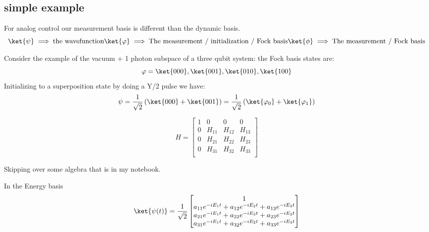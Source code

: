 \subsection{simple example}
For analog control our measurement basis is different than the dynamic basis.
\begin{equation*}
    \ket{\psi} \implies \textrm{the wavefunction}
    \ket{\varphi} \implies \textrm{The measurement / initialization / Fock basis}
    \ket{\phi} \implies \textrm{The measurement / Fock basis}
\end{equation*}

Consider the example of the vacuum + 1 photon subspace of a three qubit system:
the Fock basis states are:
\begin{equation*}
    \varphi = \ket{000}, \ket{001}, \ket{010}, \ket{100}
\end{equation*}
Initializing to a superposition state by doing a Y/2 pulse we have:
\begin{equation*}
    \psi = \frac{1}{\sqrt{2}} \left( \ket{000} + \ket{001} \right) = \frac{1}{\sqrt{2}} \left( \ket{\varphi_0} + \ket{\varphi_1} \right)
\end{equation*}

\begin{equation}
    H=
    \begin{bmatrix}
        1 & 0 & 0 & 0 \\
        0 & H_{11} & H_{12} & H_{13} \\
        0 & H_{21} & H_{22} & H_{23} \\
        0 & H_{31} & H_{32} & H_{33} \\
    \end{bmatrix}
\end{equation}

Skipping over some algebra that is in my notebook.

In the Energy basis
\begin{equation}
    \ket{\psi (t)} = \frac{1}{\sqrt{2}}
    \begin{bmatrix}
        1 \\
        a_{11} e^{-i E_1 t} + a_{12} e^{-i E_2 t} + a_{13} e^{-i E_3 t} \\
        a_{21} e^{-i E_1 t} + a_{22} e^{-i E_2 t} + a_{23} e^{-i E_3 t} \\
        a_{31} e^{-i E_1 t} + a_{32} e^{-i E_2 t} + a_{33} e^{-i E_3 t}
    \end{bmatrix}
\end{equation}

